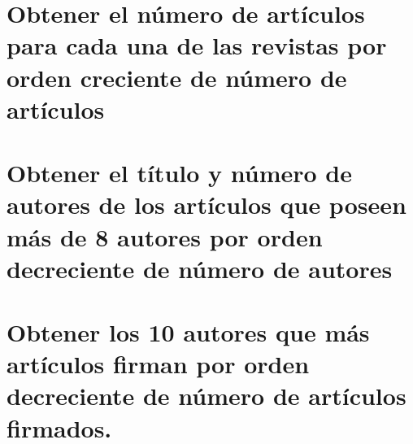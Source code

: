 \documentclass[10pt,a4paper]{report}
\begin{document}
	
	
	
	
	
	\section{Obtener  el  n\'umero  de  art\'iculos  para  cada  una  de  las  revistas  por  orden  creciente  de n\'umero de art\'iculos}
	
	
	
	
	
	
	
	
	
	\section{Obtener el t\'itulo y n\'umero de autores de los art\'iculos que poseen m\'as de 8 autores por orden decreciente de n\'umero de autores}
	
	
	
	
	
	
	
	
	
	\section{Obtener  los  10  autores  que  m\'as  art\'iculos  firman  por  orden  decreciente  de  n\'umero de art\'iculos firmados. }
	
	
	
	
	
	
	
	
\end{document}
